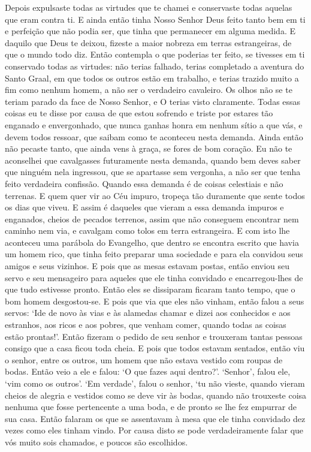 Depois expulsaste todas as virtudes que te chamei e conservaste todas
aquelas que eram contra ti. E ainda então tinha Nosso Senhor Deus feito tanto
bem em ti e perfeição que não podia ser, que tinha que permanecer em alguma
medida. E daquilo que Deus te deixou, fizeste a maior nobreza em terras
estrangeiras, de que o mundo todo diz. Então contempla o que poderias ter
feito, se tivesses em ti conservado todas as virtudes: não terias falhado,
terias completado a aventura do Santo Graal, em que todos os outros estão em
trabalho, e terias trazido muito a fim como nenhum homem, a não ser o
verdadeiro cavaleiro. Os olhos não se te teriam parado da face de Nosso Senhor,
e O terias visto claramente. Todas essas coisas eu te disse por causa de que
estou sofrendo e triste por estares tão enganado e envergonhado, que nunca
ganhas honra em nenhum sítio a que vás, e devem todos ressoar, que saibam como
te aconteceu nesta demanda. Ainda então não pecaste tanto, que ainda vens à
graça, se fores de bom coração. Eu não te aconselhei que cavalgasses
futuramente nesta demanda, quando bem deves saber que ninguém nela ingressou,
que se apartasse sem vergonha, a não ser que tenha feito verdadeira confissão.
Quando essa demanda é de coisas celestiais e não terrenas. E quem quer vir ao
Céu impuro, tropeça tão duramente que sente todos os dias que viveu. E assim é
daqueles que vieram a essa demanda impuros e enganados, cheios de pecados
terrenos, assim que não conseguem encontrar nem caminho nem via, e cavalgam
como tolos em terra estrangeira. E com isto lhe aconteceu uma parábola do
Evangelho, que dentro se encontra escrito que havia um homem rico, que tinha
feito preparar uma sociedade e para ela convidou seus amigos e seus vizinhos. E
pois que as mesas estavam postas, então enviou seu servo e seu mensageiro para
aqueles que ele tinha convidado e encarregou-lhes de que tudo estivesse pronto.
Então eles se dissiparam ficaram tanto tempo, que o bom homem desgostou-se. E
pois que via que eles não vinham, então falou a seus servos: ‘Ide de novo às
vias e às alamedas chamar e dizei aos conhecidos e aos estranhos, aos ricos e
aos pobres, que venham comer, quando todas as coisas estão prontas!’. Então
fizeram o pedido de seu senhor e trouxeram tantas pessoas consigo que a casa
ficou toda cheia. E pois que todos estavam sentados, então viu o senhor, entre
os outros, um homem que não estava vestido com roupas de bodas. Então veio a
ele e falou: ‘O que fazes aqui dentro?’. ‘Senhor’, falou ele, ‘vim como os
outros’. ‘Em verdade’, falou o senhor, ‘tu não vieste, quando vieram cheios de
alegria e vestidos como se deve vir às bodas, quando não trouxeste coisa
nenhuma que fosse pertencente a uma boda, e de pronto se lhe fez empurrar de
sua casa. Então falaram os que se assentavam à mesa que ele tinha convidado dez
vezes como eles tinham vindo. Por causa disto se pode verdadeiramente falar que
vós muito sois chamados, e poucos são escolhidos. 

